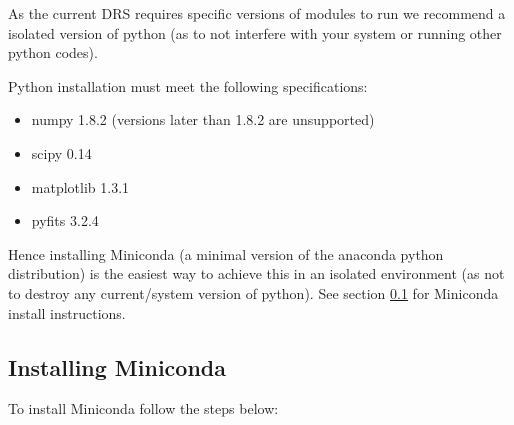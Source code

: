 As the current DRS requires specific versions of modules to run we recommend a isolated version of python (as to not interfere with your system or running other python codes). 

\noindent Python installation must meet the following specifications:

\begin{itemize}
\item  numpy 1.8.2 (versions later than 1.8.2 are unsupported)
\item  scipy 0.14
\item  matplotlib 1.3.1
\item  pyfits 3.2.4 
\end{itemize}

\noindent Hence installing Miniconda (a minimal version of the anaconda python distribution) is the easiest way to achieve this in an isolated environment (as not to destroy any current/system version of python). See section \ref{section:install-miniconda} for Miniconda install instructions.


\subsection{Installing Miniconda}
\label{section:install-miniconda}

To install Miniconda follow the steps below:


